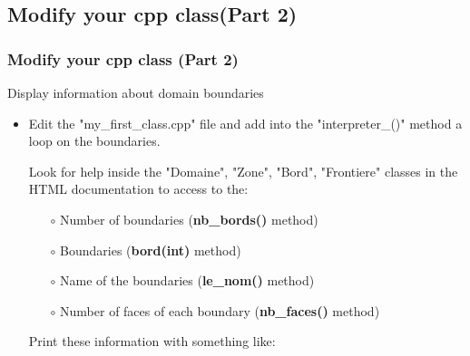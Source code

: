 \documentclass[10pt, hyperref={unicode=true,pdfusetitle, bookmarks=true,bookmarksnumbered=false,bookmarksopen=false, breaklinks=false,pdfborder={0 0 1},backref=true,colorlinks=true,linkcolor=darkblue,pageanchor, urlcolor=darkblue}]{beamer}
\begin{document}
\subsection{{\bf{Modify your cpp class(Part 2)}}}
\begin{frame}
\frametitle{Modify your cpp class (Part 2)}
\begin{block}{Display information about domain boundaries}

\begin{itemize}

\item Edit the "my\_first\_class.cpp" file and add into the "interpreter\_()" method a loop on the boundaries.

Look for help inside the "Domaine", "Zone", "Bord", "Frontiere" classes in the HTML documentation to access to the:
    \begin{itemize}
    \item [$\circ$] Number of boundaries (\textbf{nb\_bords()} method)
    \item [$\circ$] Boundaries (\textbf{bord(int)} method)
    \item [$\circ$] Name of the boundaries (\textbf{le\_nom()} method)
    \item [$\circ$] Number of faces of each boundary (\textbf{nb\_faces()} method)
    \end{itemize}

Print these information with something like:
\begin{center}
\end{center}
\end{itemize}

\end{block}
\end{frame}
\end{document}

